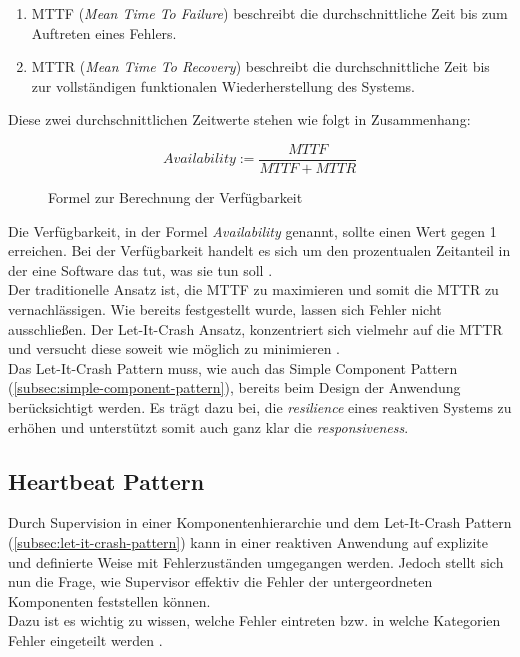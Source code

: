 \begin{enumerate}
\item MTTF (\textit{Mean Time To Failure}) beschreibt die durchschnittliche Zeit bis zum Auftreten eines Fehlers.
\item MTTR (\textit{Mean Time To Recovery}) beschreibt die durchschnittliche Zeit bis zur vollständigen funktionalen Wiederherstellung des Systems.
\end{enumerate}

Diese zwei durchschnittlichen Zeitwerte stehen wie folgt in Zusammenhang:

\begin{figure}[H]
\[Availability := \frac{MTTF}{MTTF + MTTR}\]
\caption{Formel zur Berechnung der Verfügbarkeit}
\end{figure}

Die Verfügbarkeit, in der Formel \textit{Availability} genannt, sollte einen Wert gegen 1 erreichen. Bei der Verfügbarkeit handelt es sich um den prozentualen Zeitanteil in der eine Software das tut, was sie tun soll \cite[S.~11]{hanmer_patterns_2007}.\\
Der traditionelle Ansatz ist, die MTTF zu maximieren und somit die MTTR zu vernachlässigen. Wie bereits festgestellt wurde, lassen sich Fehler nicht ausschließen. Der Let-It-Crash Ansatz, konzentriert sich vielmehr auf die MTTR und versucht diese soweit wie möglich zu minimieren \cite[S.~198]{kuhn_reactive_2015} \cite{friedrichsen_unkaputtbar_2014}.\\

Das Let-It-Crash Pattern muss, wie auch das Simple Component Pattern (\ref{subsec:simple-component-pattern}), bereits beim Design der Anwendung berücksichtigt werden. Es trägt dazu bei, die \textit{resilience} eines reaktiven Systems zu erhöhen und unterstützt somit auch ganz klar die \textit{responsiveness}.

\pagebreak

\subsection{Heartbeat Pattern}\label{subsec:heartbeat-pattern}
Durch Supervision in einer Komponentenhierarchie und dem Let-It-Crash Pattern (\ref{subsec:let-it-crash-pattern}) kann in einer reaktiven Anwendung auf explizite und definierte Weise mit Fehlerzuständen umgegangen werden. Jedoch stellt sich nun die Frage, wie Supervisor effektiv die Fehler der untergeordneten Komponenten feststellen können.\\
Dazu ist es wichtig zu wissen, welche Fehler eintreten bzw. in welche Kategorien Fehler eingeteilt werden \cite{friedrichsen_unkaputtbar_2014}.

